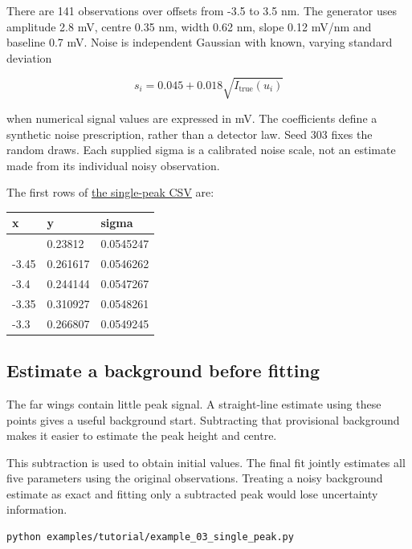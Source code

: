 \documentclass[
  british,
  10pt,
  a4paper,
]{article}
\begin{document}
There are 141 observations over offsets from -3.5 to 3.5 nm. The
generator uses amplitude 2.8 mV, centre 0.35 nm, width 0.62 nm, slope
0.12 mV/nm and baseline 0.7 mV. Noise is independent Gaussian with
known, varying standard deviation

\begin{equation}s_i = 0.045 + 0.018\sqrt{I_{\mathrm{true}}(u_i)}\end{equation}

when numerical signal values are expressed in mV. The coefficients
define a synthetic noise prescription, rather than a detector law. Seed
303 fixes the random draws. Each supplied sigma is a calibrated noise
scale, not an estimate made from its individual noisy observation.

The first rows of \href{data/single_peak.csv}{the single-peak CSV} are:

\begin{longtable}[]{@{}lll@{}}
\toprule\noalign{}
x & y & sigma \\
\midrule\noalign{}
\endhead
\bottomrule\noalign{}
\endlastfoot
-3.5 & 0.23812 & 0.0545247 \\
-3.45 & 0.261617 & 0.0546262 \\
-3.4 & 0.244144 & 0.0547267 \\
-3.35 & 0.310927 & 0.0548261 \\
-3.3 & 0.266807 & 0.0549245 \\
\end{longtable}


\subsection{Estimate a background before
fitting}\label{estimate-a-background-before-fitting}

The far wings contain little peak signal. A straight-line estimate using
these points gives a useful background start. Subtracting that
provisional background makes it easier to estimate the peak height and
centre.

This subtraction is used to obtain initial values. The final fit jointly
estimates all five parameters using the original observations. Treating
a noisy background estimate as exact and fitting only a subtracted peak
would lose uncertainty information.

\par\noindent\begin{minipage}{\linewidth}

\begin{lstlisting}[language=sh]
python examples/tutorial/example_03_single_peak.py
\end{lstlisting}

\end{minipage}\par
\end{document}
